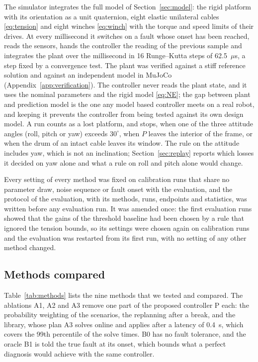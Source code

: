 \documentclass[a4paper,fleqn]{cas-dc}
\begin{document}
The simulator integrates the full model of Section~\ref{sec:model}: the rigid platform with its orientation as a unit quaternion, eight elastic unilateral cables \eqref{eq:tension} and eight winches \eqref{eq:winch} with the torque and speed limits of their drives. At every millisecond it switches on a fault whose onset has been reached, reads the sensors, hands the controller the reading of the previous sample and integrates the plant over the millisecond in 16 Runge--Kutta steps of 62.5~$\mu$s, a step fixed by a convergence test. The plant was verified against a stiff reference solution and against an independent model in MuJoCo \citep{todorov2012mujoco} (Appendix~\ref{app:verification}). The controller never reads the plant state, and it uses the nominal parameters and the rigid model \eqref{eq:NE}; the gap between plant and prediction model is the one any model based controller meets on a real robot, and keeping it prevents the controller from being tested against its own design model. A run counts as a lost platform, and stops, when one of the three attitude angles (roll, pitch or yaw) exceeds $30^\circ$, when $P$ leaves the interior of the frame, or when the drum of an intact cable leaves its window. The rule on the attitude includes yaw, which is not an inclination; Section~\ref{sec:replay} reports which losses it decided on yaw alone and what a rule on roll and pitch alone would change.

Every setting of every method was fixed on calibration runs that share no parameter draw, noise sequence or fault onset with the evaluation, and the protocol of the evaluation, with its methods, runs, endpoints and statistics, was written before any evaluation run. It was amended once: the first evaluation runs showed that the gains of the threshold baseline had been chosen by a rule that ignored the tension bounds, so its settings were chosen again on calibration runs and the evaluation was restarted from its first run, with no setting of any other method changed.

\subsection{Methods compared}\label{sec:methods}

Table~\ref{tab:methods} lists the nine methods that we tested and compared. The ablations A1, A2 and A3 remove one part of the proposed controller P each: the probability weighting of the scenarios, the replanning after a break, and the library, whose plan A3 solves online and applies after a latency of 0.4~s, which covers the 99th percentile of the solve times. B0 has no fault tolerance, and the oracle B1 is told the true fault at its onset, which bounds what a perfect diagnosis would achieve with the same controller.
\end{document}
